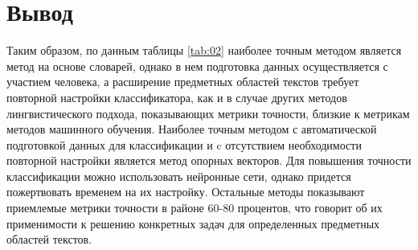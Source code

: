 \section{Вывод}

Таким образом, по данным таблицы \ref{tab:02} наиболее точным методом является
метод на основе словарей, однако в нем подготовка данных осуществляется с
участием человека, а расширение предметных областей текстов требует повторной
настройки классификатора, как и в случае других методов лингвистического
подхода, показывающих метрики точности, близкие к метрикам методов машинного обучения. Наиболее точным методом с автоматической
подготовкой данных для классификации и c отсутствием необходимости повторной
настройки является метод опорных векторов.  Для повышения точности классификации
можно использовать нейронные сети, однако придется пожертвовать временем на их
настройку. Остальные методы показывают приемлемые метрики точности в районе
60-80 процентов, что говорит об их применимости к решению конкретных задач для
определенных предметных областей текстов.


